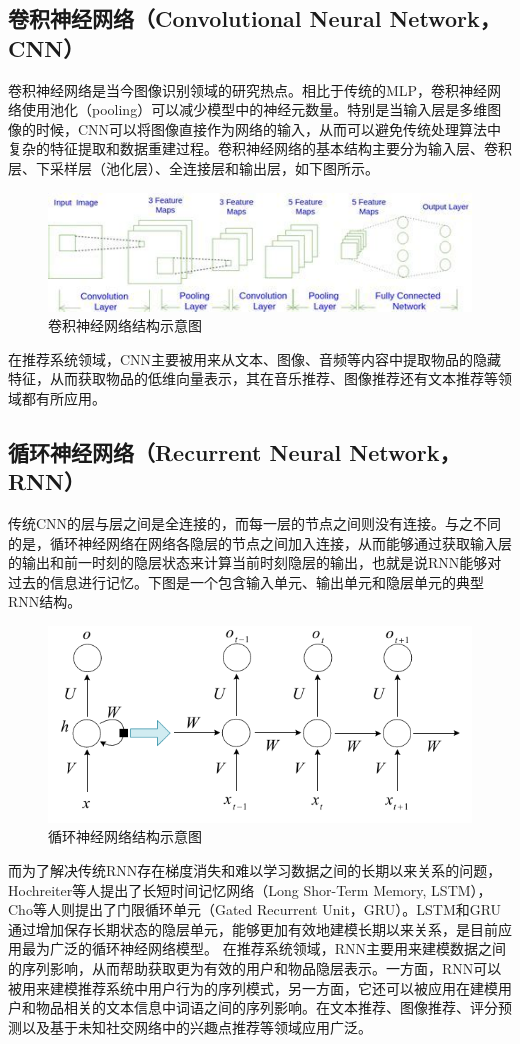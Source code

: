 \subsection{卷积神经网络（Convolutional Neural Network，CNN）}
卷积神经网络是当今图像识别领域的研究热点。相比于传统的MLP，卷积神经网络使用池化（pooling）可以减少模型中的神经元数量。特别是当输入层是多维图像的时候，CNN可以将图像直接作为网络的输入，从而可以避免传统处理算法中复杂的特征提取和数据重建过程。卷积神经网络的基本结构主要分为输入层、卷积层、下采样层（池化层）、全连接层和输出层，如下图所示。

\begin{figure}[htbp]
\centering
\includegraphics[width=0.5\linewidth]{images/CNN.jpg}
\caption{卷积神经网络结构示意图}
\label{fig:fig3}
\end{figure}

在推荐系统领域，CNN主要被用来从文本、图像、音频等内容中提取物品的隐藏特征，从而获取物品的低维向量表示，其在音乐推荐、图像推荐还有文本推荐等领域都有所应用\cite{GengZBC15IMAGE}。
\subsection{循环神经网络（Recurrent Neural Network，RNN）}
传统CNN的层与层之间是全连接的，而每一层的节点之间则没有连接。与之不同的是，循环神经网络在网络各隐层的节点之间加入连接，从而能够通过获取输入层的输出和前一时刻的隐层状态来计算当前时刻隐层的输出，也就是说RNN能够对过去的信息进行记忆。下图是一个包含输入单元、输出单元和隐层单元的典型RNN结构。

\begin{figure}[htbp]
\centering
\includegraphics[width=0.5\linewidth]{images/RNN.png}
\caption{循环神经网络结构示意图}
\label{fig:fig4}
\end{figure}

而为了解决传统RNN存在梯度消失和难以学习数据之间的长期以来关系的问题，Hochreiter等人\cite{HochreiterS97LSTM}提出了长短时间记忆网络（Long Shor-Term Memory, LSTM），Cho等人\cite{ChoMBB14GRU}则提出了门限循环单元（Gated Recurrent Unit，GRU）。LSTM和GRU通过增加保存长期状态的隐层单元，能够更加有效地建模长期以来关系，是目前应用最为广泛的循环神经网络模型。
在推荐系统领域，RNN主要用来建模数据之间的序列影响，从而帮助获取更为有效的用户和物品隐层表示。一方面，RNN可以被用来建模推荐系统中用户行为的序列模式\cite{WuABSJ17RRN}\cite{SongEH16DL4TR}，另一方面，它还可以被应用在建模用户和物品相关的文本信息中词语之间的序列影响\cite{0014SY16CRA}\cite{0014SY16CRA}。在文本推荐、图像推荐、评分预测以及基于未知社交网络中的兴趣点推荐等领域应用广泛。
